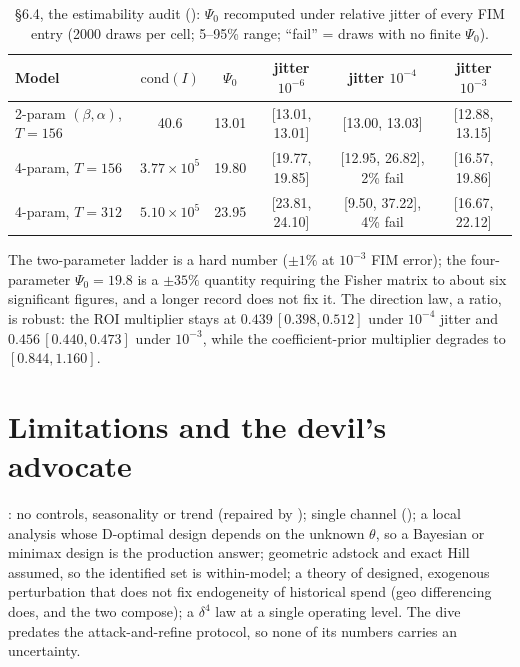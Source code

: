 \begin{table}[htbp]
\centering\small
\caption{ \S6.4, the estimability audit (): $\Psi_0$ recomputed under relative jitter of every FIM entry (2000 draws per cell; 5--95\% range; ``fail'' = draws with no finite $\Psi_0$).}
\label{ident:tab:audit}
\begin{tabular}{lccccc}
\toprule
Model & $\mathrm{cond}(I)$ & $\Psi_0$ & jitter $10^{-6}$ & jitter $10^{-4}$ & jitter $10^{-3}$ \\
\midrule
2-param $(\beta, \alpha)$, $T = 156$ & 40.6 & 13.01 & [13.01, 13.01] & [13.00, 13.03] & [12.88, 13.15] \\
4-param, $T = 156$ & $3.77\times10^5$ & 19.80 & [19.77, 19.85] & [12.95, 26.82], 2\% fail & [16.57, 19.86] \\
4-param, $T = 312$ & $5.10\times10^5$ & 23.95 & [23.81, 24.10] & [9.50, 37.22], 4\% fail & [16.67, 22.12] \\
\bottomrule
\end{tabular}
\end{table}

The two-parameter ladder is a hard number ($\pm1\%$ at $10^{-3}$ FIM error); the four-parameter $\Psi_0 = 19.8$ is a $\pm35\%$ quantity requiring the Fisher matrix to about six significant figures, and a longer record does not fix it. The direction law, a ratio, is robust: the ROI multiplier stays at $0.439\,[0.398, 0.512]$ under $10^{-4}$ jitter and $0.456\,[0.440, 0.473]$ under $10^{-3}$, while the coefficient-prior multiplier degrades to $[0.844, 1.160]$.

\section{Limitations and the devil's advocate}

: no controls, seasonality or trend (repaired by ); single channel (); a local analysis whose D-optimal design depends on the unknown $\theta$, so a Bayesian or minimax design is the production answer; geometric adstock and exact Hill assumed, so the identified set is within-model; a theory of designed, exogenous perturbation that does not fix endogeneity of historical spend (geo differencing does, and the two compose); a $\delta^4$ law at a single operating level. The dive predates the attack-and-refine protocol, so none of its numbers carries an uncertainty.

